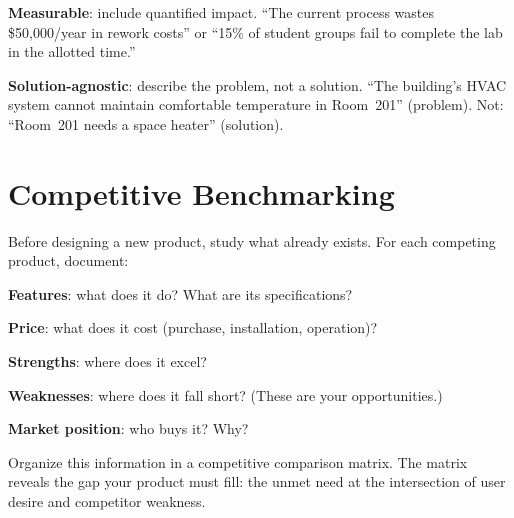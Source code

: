 \textbf{Measurable}: include quantified impact. ``The current process wastes \$50{,}000/year in rework costs'' or ``15\% of student groups fail to complete the lab in the allotted time.''

\textbf{Solution-agnostic}: describe the problem, not a solution. ``The building's HVAC system cannot maintain comfortable temperature in Room~201'' (problem). Not: ``Room~201 needs a space heater'' (solution).

\section{Competitive Benchmarking}
Before designing a new product, study what already exists. For each competing product, document:

\textbf{Features}: what does it do? What are its specifications?

\textbf{Price}: what does it cost (purchase, installation, operation)?

\textbf{Strengths}: where does it excel?

\textbf{Weaknesses}: where does it fall short? (These are your opportunities.)

\textbf{Market position}: who buys it? Why?

Organize this information in a competitive comparison matrix. The matrix reveals the gap your product must fill: the unmet need at the intersection of user desire and competitor weakness.
